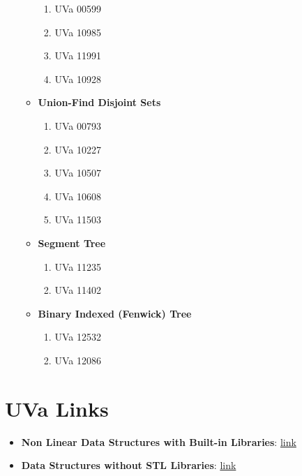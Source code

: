 \documentclass[11pt, oneside]{article}   	%
\begin{document}
\begin{enumerate}
\begin{itemize}
\begin{enumerate}
				    \item UVa 00599
				    \item UVa 10985
				    \item UVa 11991
				    \item UVa 10928				    				    		
				\end{enumerate}
		    \item \textbf{Union-Find Disjoint Sets}
		    	\begin{enumerate}
				    \item UVa 00793
				    \item UVa 10227
				    \item UVa 10507
				    \item UVa 10608				    				    							    \item UVa 11503	    
				\end{enumerate}
		    \item \textbf{Segment Tree}
		    	\begin{enumerate}
				    \item UVa 11235
				    \item UVa 11402				    
				\end{enumerate}
		    \item \textbf{Binary Indexed (Fenwick) Tree}
				\begin{enumerate}
				    \item UVa 12532
				    \item UVa 12086				    
				\end{enumerate}		    
		\end{itemize}
\end{enumerate}

\section*{UVa Links}

\begin{itemize}
    \item \textbf{Non Linear Data Structures with Built-in Libraries}: \href{https://onlinejudge.org/index.php?option=com_onlinejudge&Itemid=8&category=630}{link}
    \item \textbf{Data Structures without STL Libraries}: \href{https://onlinejudge.org/index.php?option=com_onlinejudge&Itemid=8&category=634}{link}
\end{itemize}
\end{document}
